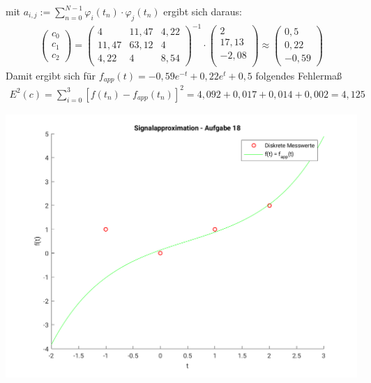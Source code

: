 	mit $a_{i,j}:= \sum_{n=0}^{N-1}\varphi_i(t_n)\cdot \varphi_j(t_n)$ ergibt sich daraus:
	\begin{align*}
		\left(\begin{matrix}c_0\\c_1\\c_2\end{matrix}\right) = 
		\left(\begin{matrix}
			4		&	11,47	& 4,22\\
			11,47	&	63,12	& 4\\
			4,22	&	4		& 8,54
		\end{matrix}\right)^{-1} \cdot
		\left(\begin{matrix}
			2\\
			17,13\\
			-2,08\\
		\end{matrix}\right) \approx 
		\left(\begin{matrix}
			0,5\\
			0,22\\
			-0,59
		\end{matrix}\right)
	\end{align*}
	Damit ergibt sich für $f_{app}(t) = -0,59 e^{-t}+0,22 e^{t}+0,5$ folgendes Fehlermaß
	\begin{align*}
		E^2(c) = \sum_{i=0}^3 \left[ f(t_n) - f_{app}(t_n)\right]^2 = 4,092 + 0,017 + 0,014 + 0,002 = 4,125
	\end{align*}
	
	\includegraphics[scale = 0.8]{A18_functionPlot.png}
\newpage
